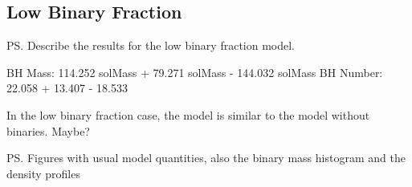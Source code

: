 


\subsection{Low Binary Fraction}
\ps{Describe the results for the low binary fraction model.}


BH Mass: 114.252 solMass + 79.271 solMass - 144.032 solMass
BH Number: 22.058 + 13.407 - 18.533




In the low binary fraction case, the model is similar to the model without binaries. Maybe?

\ps{Figures with usual model quantities, also the binary mass histogram and the density profiles}



